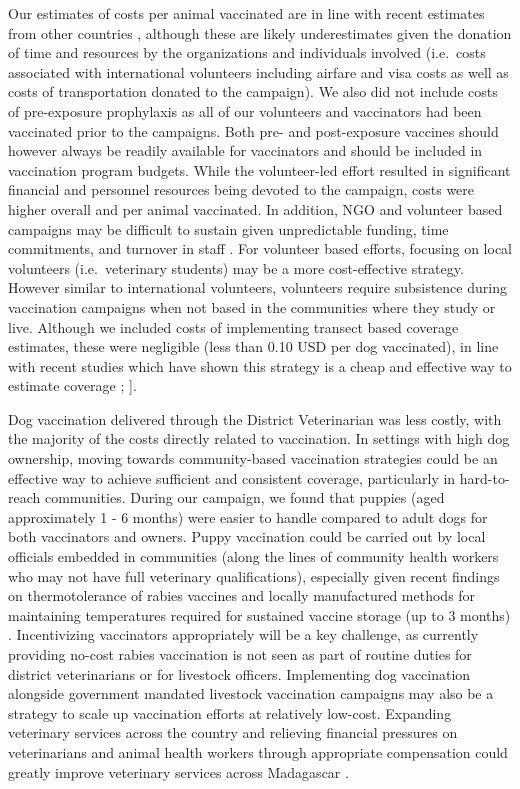 \documentclass[tropicalmed,article,submit,moreauthors,pdftex]{mdpi}
\begin{document}
Our estimates of costs per animal vaccinated are in line with recent
estimates from other countries \citep{undurraga2020}, although these are
likely underestimates given the donation of time and resources by the
organizations and individuals involved (i.e.~costs associated with
international volunteers including airfare and visa costs as well as
costs of transportation donated to the campaign). We also did not
include costs of pre-exposure prophylaxis as all of our volunteers and
vaccinators had been vaccinated prior to the campaigns. Both pre- and
post-exposure vaccines should however always be readily available for
vaccinators and should be included in vaccination program budgets. While
the volunteer-led effort resulted in significant financial and personnel
resources being devoted to the campaign, costs were higher overall and
per animal vaccinated. In addition, NGO and volunteer based campaigns
may be difficult to sustain given unpredictable funding, time
commitments, and turnover in staff \citep{ferguson2020}. For volunteer
based efforts, focusing on local volunteers (i.e.~veterinary students)
may be a more cost-effective strategy. However similar to international
volunteers, volunteers require subsistence during vaccination campaigns
when not based in the communities where they study or live. Although we
included costs of implementing transect based coverage estimates, these
were negligible (less than 0.10 USD per dog vaccinated), in line with
recent studies which have shown this strategy is a cheap and effective
way to estimate coverage \citet{sambo2017}; \citet{gibson2015}{]}.

Dog vaccination delivered through the District Veterinarian was less
costly, with the majority of the costs directly related to vaccination.
In settings with high dog ownership, moving towards community-based
vaccination strategies could be an effective way to achieve sufficient
and consistent coverage, particularly in hard-to-reach communities.
During our campaign, we found that puppies (aged approximately 1 - 6
months) were easier to handle compared to adult dogs for both
vaccinators and owners. Puppy vaccination could be carried out by local
officials embedded in communities (along the lines of community health
workers who may not have full veterinary qualifications), especially
given recent findings on thermotolerance of rabies vaccines and locally
manufactured methods for maintaining temperatures required for sustained
vaccine storage (up to 3 months) \citep{lugelo2020}. Incentivizing
vaccinators appropriately will be a key challenge, as currently
providing no-cost rabies vaccination is not seen as part of routine
duties for district veterinarians or for livestock officers.
Implementing dog vaccination alongside government mandated livestock
vaccination campaigns may also be a strategy to scale up vaccination
efforts at relatively low-cost. Expanding veterinary services across the
country and relieving financial pressures on veterinarians and animal
health workers through appropriate compensation could greatly improve
veterinary services across Madagascar \citep{mondiale2017evaluation}.
\end{document}
